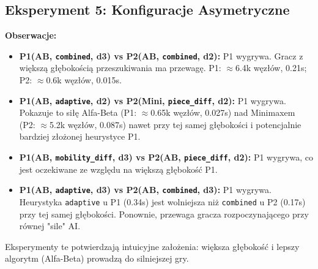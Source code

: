 \documentclass[11pt,a4paper]{article}
\newcommand{\code}[1]{\texttt{#1}} %
\begin{document}
\subsection{Eksperyment 5: Konfiguracje Asymetryczne}
\textbf{Obserwacje:}
\begin{itemize}
    \item \textbf{P1(AB, \code{combined}, d3) vs P2(AB, \code{combined}, d2):} P1 wygrywa. Gracz z większą głębokością przeszukiwania ma przewagę. P1: $\approx$6.4k węzłów, 0.21s; P2: $\approx$0.6k węzłów, 0.015s.
    \item \textbf{P1(AB, \code{adaptive}, d2) vs P2(Mini, \code{piece\_diff}, d2):} P1 wygrywa. Pokazuje to siłę Alfa-Beta (P1: $\approx$0.65k węzłów, 0.027s) nad Minimaxem (P2: $\approx$5.2k węzłów, 0.087s) nawet przy tej samej głębokości i potencjalnie bardziej złożonej heurystyce P1.
    \item \textbf{P1(AB, \code{mobility\_diff}, d3) vs P2(AB, \code{piece\_diff}, d2):} P1 wygrywa, co jest oczekiwane ze względu na większą głębokość P1.
    \item \textbf{P1(AB, \code{adaptive}, d3) vs P2(AB, \code{combined}, d3):} P1 wygrywa. Heurystyka \code{adaptive} u P1 (0.34s) jest wolniejsza niż \code{combined} u P2 (0.17s) przy tej samej głębokości. Ponownie, przewaga gracza rozpoczynającego przy równej "sile" AI.
\end{itemize}
Eksperymenty te potwierdzają intuicyjne założenia: większa głębokość i lepszy algorytm (Alfa-Beta) prowadzą do silniejszej gry.
\end{document}
